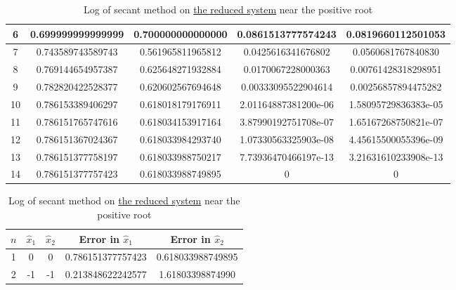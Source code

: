 \begin{table}[H]
\begin{table}[H]
\begin{table}[H]
\begin{table}[H]
\begin{table}[htbp]
\begin{subtable}[t]{\textwidth}
\begin{tabular}{|c|c|c|c|c|}
		6	&	\footnotesize	0.699999999999999		&	\footnotesize	0.700000000000000	&	\footnotesize	0.0861513777574243		&	\footnotesize	0.0819660112501053		\\	\hline
		7	&	\footnotesize	0.743589743589743		&	\footnotesize	0.561965811965812	&	\footnotesize	0.0425616341676802		&	\footnotesize	0.0560681767840830		\\	\hline
		8	&	\footnotesize	0.769144654957387		&	\footnotesize	0.625648271932884	&	\footnotesize	0.0170067228000363		&	\footnotesize	0.00761428318298951		\\	\hline
		9	&	\footnotesize	0.782820422528377		&	\footnotesize	0.620602567694648	&	\footnotesize	0.00333095522904614		&	\footnotesize	0.00256857894475282		\\	\hline
		10	&	\footnotesize	0.786153389406297		&	\footnotesize	0.618018179176911	&	\footnotesize	2.01164887381200e-06	&	\footnotesize	1.58095729836383e-05	\\	\hline
		11	&	\footnotesize	0.786151765747616		&	\footnotesize	0.618034153917164	&	\footnotesize	3.87990192751708e-07	&	\footnotesize	1.65167268750821e-07	\\	\hline
		12	&	\footnotesize	0.786151367024367		&	\footnotesize	0.618033984293740	&	\footnotesize	1.07330563325903e-08	&	\footnotesize	4.45615500055396e-09	\\	\hline
		13	&	\footnotesize	0.786151377758197		&	\footnotesize	0.618033988750217	&	\footnotesize	7.73936470466197e-13	&	\footnotesize	3.21631610233908e-13	\\	\hline
		14	&	\footnotesize	0.786151377757423		&	\footnotesize	0.618033988749895	&	\footnotesize	0						&	\footnotesize	0						\\	\hline
		\end{tabular}
		\caption{Log of secant method on \hyperref[eqn1reduce]{the reduced system} near the positive root}
		\label{logeqn1se+}
	\end{subtable}	
	\begin{subtable}[t]{\textwidth}
		\centering
		\begin{tabular}{|c|c|c|c|c|}
		\hline
		\(n\)	&	\(\hat{x}_1\)	&	\(\hat{x}_2\)	&	Error in \(\hat{x}_1\)	&	Error in \(\hat{x}_2\)		\\	\hline
		1	&	\footnotesize	0						&	\footnotesize	0					&	\footnotesize	0.786151377757423		&	\footnotesize	0.618033988749895		\\	\hline
		2	&	\footnotesize	-1						&	\footnotesize	-1					&	\footnotesize	0.213848622242577		&	\footnotesize	1.61803398874990		\\	\hline

\end{tabular}
\end{subtable}
\end{table}
\end{table}
\end{table}
\end{table}
\end{table}
